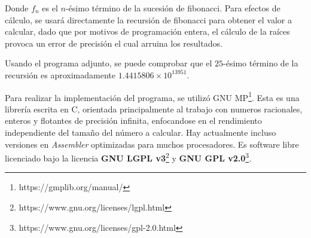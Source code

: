 Donde $f_n$ es el $n$-ésimo término de la sucesión de fibonacci. Para efectos de cálculo, se usará directamente la recursión de fibonacci para obtener el valor a calcular, dado que por motivos de programación entera, el cálculo de la raíces provoca un error de precisión el cual arruina los resultados.

Usando el programa adjunto, se puede comprobar que el $25$-ésimo término de la recursión es aproximadamente $1.4415806\times10^{13951}$.

Para realizar la implementación del programa, se utilizó GNU MP\footnote{https://gmplib.org/manual/}. Esta es una librería escrita en C, orientada principalmente al trabajo con numeros racionales, enteros y flotantes de precisión infinita, enfocandose en el rendimiento independiente del tamaño del número a calcular. Hay actualmente incluso versiones en \textit{Assembler} optimizadas para muchos procesadores. Es software libre licenciado bajo la licencia \textbf{GNU LGPL v3}\footnote{https://www.gnu.org/licenses/lgpl.html} y \textbf{GNU GPL v2.0}\footnote{https://www.gnu.org/licenses/gpl-2.0.html}.